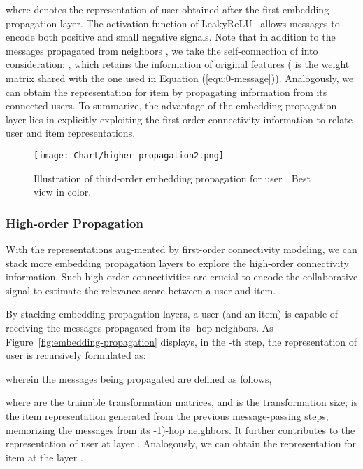 \documentclass[sigconf]{acmart}
\theoremstyle{definition}
\begin{document}
where  denotes the representation of user  obtained after the first embedding propagation layer. 
The activation function of LeakyReLU~\cite{LeakyRelu} allows messages to encode both positive and small negative signals.
Note that in addition to the messages propagated from neighbors ,  we take the self-connection of  into consideration: , which retains the information of original features ( is the weight matrix shared with the one used in Equation (\ref{equ:0-message})).
Analogously, we can obtain the representation  for item  by propagating information from its connected users.
To summarize, the advantage of the embedding propagation layer lies in explicitly exploiting the first-order connectivity information to relate user and item representations.

\begin{figure}[t]
\centering
\texttt{[image: Chart/higher-propagation2.png]}
\vspace{-10pt}
\caption{Illustration of third-order embedding propagation for user . Best view in color. 
}
\label{fig:higher-order-propagation}
\vspace{-15pt}
\end{figure}

\vspace{5px}
\subsubsection{\textbf{High-order Propagation}}
With the representations aug-mented by first-order connectivity modeling, we can stack more embedding propagation layers to explore the high-order connectivity information. Such high-order connectivities are crucial to encode the collaborative signal to estimate the relevance score between a user and item.

By stacking  embedding propagation layers, a user (and an item) is capable of receiving the messages propagated from its -hop neighbors.
As Figure~\ref{fig:embedding-propagation} displays, in the -th step, the representation of user  is recursively formulated as:

wherein the messages being propagated are defined as follows,

where  are the trainable transformation matrices, and  is the transformation size;
 is the item representation generated from the previous message-passing steps, memorizing the messages from its -1)-hop neighbors.
It further contributes to the representation of user  at layer .
Analogously, we can obtain the representation for item  at the layer .
\end{document}
